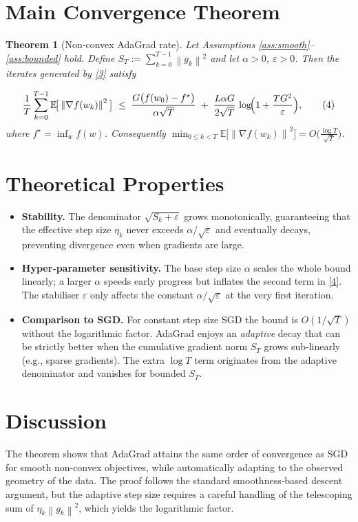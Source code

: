 \documentclass{article}
\newtheorem{theorem}{Theorem}
\newcommand{\E}{\mathbb{E}}
\newcommand{\norm}[1]{\left\lVert#1\right\rVert}
\begin{document}
\section*{Main Convergence Theorem}
\begin{theorem}[Non‑convex AdaGrad rate]\label{thm:main}
Let Assumptions \ref{ass:smooth}–\ref{ass:bounded} hold.  
Define $S_T:=\sum_{k=0}^{T-1}\norm{g_k}^{2}$ and let $\alpha>0$, $\varepsilon>0$.  
Then the iterates generated by \eqref{3} satisfy  

\[
\frac{1}{T}\sum_{k=0}^{T-1}\E\!\big[\norm{\nabla f(w_k)}^{2}\big]
\;\le\;
\frac{G\big(f(w_0)-f^{\star}\big)}{\alpha\sqrt{T}}
\;+\;
\frac{L\alpha G}{2\sqrt{T}}\,
\log\!\Bigl(1+\frac{T G^{2}}{\varepsilon}\Bigr),
\tag{4}
\]
where $f^{\star}= \inf_{w}f(w)$.  
Consequently $\displaystyle\min_{0\le k<T}\E\!\big[\norm{\nabla f(w_k)}^{2}\big]=O\!\big(\tfrac{\log T}{\sqrt{T}}\big)$.
\end{theorem}

\section*{Theoretical Properties}
\begin{itemize}[leftmargin=*]
\item \textbf{Stability.} The denominator $\sqrt{S_k+\varepsilon}$ grows monotonically, guaranteeing that the effective step size $\eta_k$ never exceeds $\alpha/\sqrt{\varepsilon}$ and eventually decays, preventing divergence even when gradients are large.
\item \textbf{Hyper‑parameter sensitivity.} The base step size $\alpha$ scales the whole bound linearly; a larger $\alpha$ speeds early progress but inflates the second term in \eqref{4}. The stabiliser $\varepsilon$ only affects the constant $\alpha/\sqrt{\varepsilon}$ at the very first iteration.
\item \textbf{Comparison to SGD.} For constant step size SGD the bound is $O(1/\sqrt{T})$ without the logarithmic factor. AdaGrad enjoys an \emph{adaptive} decay that can be strictly better when the cumulative gradient norm $S_T$ grows sub‑linearly (e.g., sparse gradients). The extra $\log T$ term originates from the adaptive denominator and vanishes for bounded $S_T$.
\end{itemize}

\section*{Discussion}
The theorem shows that AdaGrad attains the same order of convergence as SGD for smooth non‑convex objectives, while automatically adapting to the observed geometry of the data. The proof follows the standard smoothness‑based descent argument, but the adaptive step size requires a careful handling of the telescoping sum of $\eta_k\norm{g_k}^{2}$, which yields the logarithmic factor.
\end{document}
